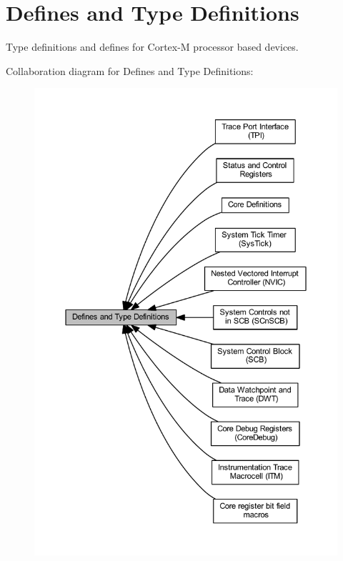 \hypertarget{group___c_m_s_i_s__core__register}{}\section{Defines and Type Definitions}
\label{group___c_m_s_i_s__core__register}


Type definitions and defines for Cortex-\/M processor based devices.  


Collaboration diagram for Defines and Type Definitions\+:
\nopagebreak
\begin{figure}[H]
\begin{center}
\leavevmode
\includegraphics[width=350pt]{group___c_m_s_i_s__core__register}
\end{center}
\end{figure}
